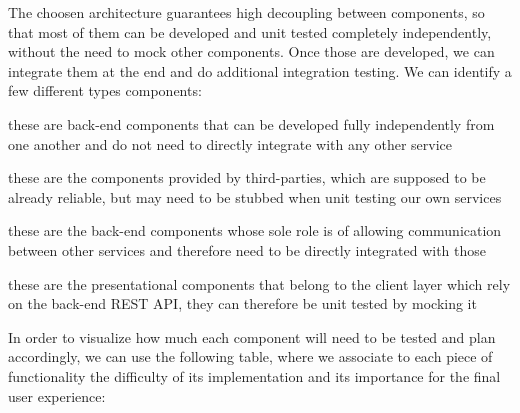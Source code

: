
The choosen architecture guarantees high decoupling between components, so that most of them
can be developed and unit tested completely independently, without the need to mock other
components. Once those are developed, we can integrate them at the end and do additional
integration testing. We can identify a few different types components:

\begin{description}[leftmargin=0pt]
     \item[Independent components:] these are back-end components that can be developed fully independently
           from one another and do not need to directly integrate with any other service
     \item[External components:] these are the components provided by third-parties, which are supposed
           to be already reliable, but may need to be stubbed when unit testing our own services
     \item[Integrating components:] these are the back-end components whose sole role is of allowing
           communication between other services and therefore need to be directly integrated with those
     \item[Front-end components:] these are the presentational components that belong to the client layer
           which rely on the back-end REST API, they can therefore be unit tested by mocking it
\end{description}

In order to visualize how much each component will need to be tested and plan accordingly, we can use
the following table, where we associate to each piece of functionality the difficulty of its 
implementation and its importance for the final user experience:

